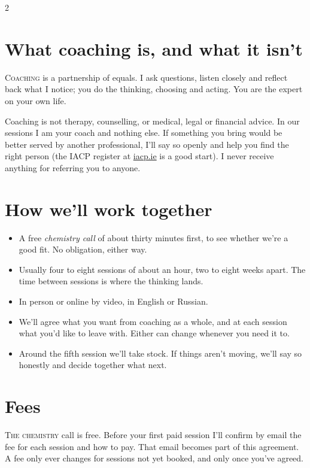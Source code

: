 \documentclass[9pt]{extarticle}
\newcommand{\initial}[2]{\lettrine[lines=2, loversize=.08, lraise=.02]{#1}{#2}}
\begin{document}
\begin{multicols}{2}
\raggedcolumns

\section{What coaching is, and what it isn't}
\initial{C}{oaching} is a partnership of equals. I ask questions, listen closely and reflect back what I notice; you do the thinking, choosing and acting. You are the expert on your own life.

Coaching is not therapy, counselling, or medical, legal or financial advice. In our sessions I am your coach and nothing else. If something you bring would be better served by another professional, I'll say so openly and help you find the right person (the IACP register at \href{https://iacp.ie/therapists}{\color{goldlight}iacp.ie} is a good start). I never receive anything for referring you to anyone.

\section{How we'll work together}
\begin{itemize}
  \item A free \emph{chemistry call} of about thirty minutes first, to see whether we're a good fit. No obligation, either way.
  \item Usually four to eight sessions of about an hour, two to eight weeks apart. The time between sessions is where the thinking lands.
  \item In person or online by video, in English or Russian.
  \item We'll agree what you want from coaching as a whole, and at each session what you'd like to leave with. Either can change whenever you need it to.
  \item Around the fifth session we'll take stock. If things aren't moving, we'll say so honestly and decide together what next.
\end{itemize}

\section{Fees}
\initial{T}{he chemistry} call is free. Before your first paid session I'll confirm by email the fee for each session and how to pay. That email becomes part of this agreement. A fee only ever changes for sessions not yet booked, and only once you've agreed.


\end{multicols}
\end{document}

